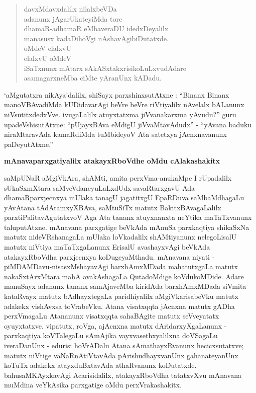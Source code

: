 \begin{verse}
davxMdavxdalilx nilalxbeVDa\\
adanunx jAgarUkateyiMda tore\\
dhamaR-adhamaR eMbaveraDU idedxDeyalilx\\
manasusx kadaDihoVgi nAshavAgibiDutatxde.\\
oMdeV elalxvU\\
elalxvU oMdeV\\
iSaTxnunx mAtarx sAkASxtakxrisikoLuLxvudAdare\\
asamagarxneMba ciMte yAranUnx kADadu.
\end{verse}

`aMgutatxra nikAya'dalilx, shiSayx parxshinxsutAtxne : ``Binanx Binanx manoVBAvadiMda kUDidavarAgi beVre beVre riVtiyalilx nAvelalx bALanunx niVsutitxdedxVve. ivugaLalilx atuyxtatxma jiVvanakarxma yAvudu?'' guru upadeVshisutAtxne: ``pUjayxBAva eMdigU jiVvaMtavAdudx'' - ``yAvana baduku niraMtaravAda kamaRdiMda tuMbideyoV Ata satetxya jAcnxnavanunx paDeyutAtxne.''

\bigskip
\begin{center}
{\Large\bf mAnavaparxgatiyalilx atakayxRboVdhe oMdu cAlakashakitx}
\end{center}

saMpUNaR aMgiVkAra, shAMti, amita perxVma-anukaMpe I rUpadalilx sUkaSxmXtara saMveVdaneyuLaLxdUdx savaRtarxgavU Ada dhamaRparxjecnxya mUlaka tanagU jagatitxgU EpaRDuva saMbaMdhagaLu yAvAtana tAdAtamxyXBAva, saMtuSiTx matutx BakitxBAvagaLalilx parxtiPalitavAgutatxvoV Aga Ata tananx atuyxnanxta neYtika maTaTxvanunx taluputAtxne. mAnavana parxgatige beVkAda mAnuSa parxkaqtiya shikaSxNa matutx nideVRshanagaLa mUlaka loVkadalilx shAMtiyanunx nelegoLisalU matutx niVtiya maTaTxgaLanunx ErisalU avashayxvAgi beVkAda atakayxRboVdha parxjecnxya koDugeyaMthadu. mAnavana niyati - piMDAMDavu-nisasxMshayavAgi barxhAmxMDada mahatutxgaLa matutx nakaSxtArxMtara mahA avakAshagaLa QutadoMdige koVdukoMDide. Adare manuSayx adanunx tananx samAjaveMba kiridAda barxhAmxMDada siVmita kataRvayx matutx bAdhayxtegaLa paridhiyalilx aMgiVkarisabeVku matutx adakekx vishAvxsa toVrabeVku. Atana visatxqqta jAcnxna matutx gADha perxVmagaLu Atananunx visatxqqta sahaBAgite matutx seVveyatatx oyuyxtatxve. vipatutx, roVga, ajAcnxna matutx dAridarxyXgaLanunx - parxkaqtiya koVTalegaLu sAmAjika vayxvasethxyalilxna doVSagaLu iveraDanUnx - edurisi hoVrADalu Atana sAmathayxRvanunx hecicxsutatxve; matutx niVtige vaNaRnAtiVtavAda pArishudhayxvanUnx gahanateyanUnx koTuTx adakekx atayxduBxtavAda athaRvanunx koDutatxde. bahusaMKAyxkavAgi Acarisidalilx, atakayxRboVdha tatatxvXvu mAnavana muMdina veYkAsika parxgatige oMdu perxVrakashakitx.

\theendnotes





